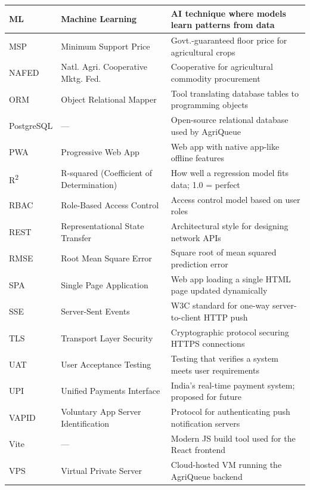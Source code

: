 \begin{longtable}{|>{\raggedright\arraybackslash}p{2.4cm}|>{\raggedright\arraybackslash}p{4.6cm}|>{\raggedright\arraybackslash}p{7.0cm}|}
ML & Machine Learning & AI technique where models learn patterns from data \\ \hline
MSP & Minimum Support Price & Govt.-guaranteed floor price for agricultural crops \\ \hline
NAFED & Natl. Agri. Cooperative Mktg. Fed. & Cooperative for agricultural commodity procurement \\ \hline
ORM & Object Relational Mapper & Tool translating database tables to programming objects \\ \hline
PostgreSQL & --- & Open-source relational database used by AgriQueue \\ \hline
PWA & Progressive Web App & Web app with native app-like offline features \\ \hline
R\textsuperscript{2} & R-squared (Coefficient of Determination) & How well a regression model fits data; 1.0 = perfect \\ \hline
RBAC & Role-Based Access Control & Access control model based on user roles \\ \hline
REST & Representational State Transfer & Architectural style for designing network APIs \\ \hline
RMSE & Root Mean Square Error & Square root of mean squared prediction error \\ \hline
SPA & Single Page Application & Web app loading a single HTML page updated dynamically \\ \hline
SSE & Server-Sent Events & W3C standard for one-way server-to-client HTTP push \\ \hline
TLS & Transport Layer Security & Cryptographic protocol securing HTTPS connections \\ \hline
UAT & User Acceptance Testing & Testing that verifies a system meets user requirements \\ \hline
UPI & Unified Payments Interface & India's real-time payment system; proposed for future \\ \hline
VAPID & Voluntary App Server Identification & Protocol for authenticating push notification servers \\ \hline
Vite & --- & Modern JS build tool used for the React frontend \\ \hline
VPS & Virtual Private Server & Cloud-hosted VM running the AgriQueue backend \\
\end{longtable}
